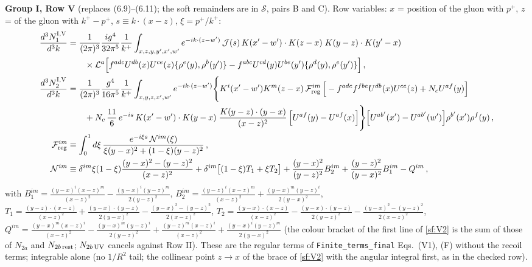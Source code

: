 \noindent\textbf{Group I, Row V} (replaces (6.9)--(6.11); the soft remainders are in $\mathcal{S}$, pairs B and C). Row variables: $x$ = position of the gluon with $p^{+}$, $z$ = of the gluon with $k^{+}-p^{+}$, $s\equiv k\cdot(x-z)$, $\xi=p^{+}/k^{+}$:
\begin{align}
\frac{d^{3}N^{\rm I,V}_{1}}{d^{3}k}&=\frac{1}{(2\pi)^{3}}\frac{ig^{4}}{32\pi^{5}}\frac{1}{k^{+}}\int_{x,z,y,y',x',w'}e^{-ik\cdot(z-w')}\,\mathcal{J}(s)\,K(x'-w')\cdot K(z-x)\;K(y-z)\cdot K(y'-x)\notag\\
&\qquad\times\mathcal{L}^{a}\Big[f^{adc}U^{db}(x)U^{ce}(z)\{\rho^{e}(y),\rho^{b}(y')\}-f^{abc}U^{cd}(y)U^{be}(y')\{\rho^{d}(y),\rho^{e}(y')\}\Big]\,,\label{sf:V1}\\
\frac{d^{3}N^{\rm I,V}_{2}}{d^{3}k}&=\frac{1}{(2\pi)^{3}}\frac{g^{4}}{16\pi^{5}}\frac{1}{k^{+}}\int_{x,y,z,x',w'}e^{-ik\cdot(z-w')}\Bigg\{K^{i}(x'-w')K^{m}(z-x)\,\mathcal{F}^{im}_{\rm reg}\,\Big[-f^{adc}f^{fbe}U^{db}(x)U^{ce}(z)+N_{c}U^{af}(y)\Big]\notag\\
&\qquad+N_{c}\,\frac{11}{6}\,e^{-is}\,K(x'-w')\cdot K(y-x)\;\frac{K(y-z)\cdot(y-x)}{(x-z)^{2}}\,\Big[U^{af}(y)-U^{af}(x)\Big]\Bigg\}\Big[U^{ab'}(x')-U^{ab'}(w')\Big]\rho^{b'}(x')\rho^{f}(y)\,,\label{sf:V2}\\
\mathcal{F}^{im}_{\rm reg}&\equiv\int_{0}^{1}d\xi\,\frac{e^{-i\xi s}\,\mathcal{N}^{im}(\xi)}{\xi(y-x)^{2}+(1-\xi)(y-z)^{2}}\,,\notag\\
\mathcal{N}^{im}&\equiv\delta^{im}\xi(1-\xi)\frac{(y-x)^{2}-(y-z)^{2}}{(x-z)^{2}}+\delta^{im}\big[(1-\xi)T_{1}+\xi T_{2}\big]+\frac{(y-x)^{2}}{(y-z)^{2}}B_{2}^{im}+\frac{(y-z)^{2}}{(y-x)^{2}}B_{1}^{im}-Q^{im}\,,\notag
\end{align}
with $B_{1}^{im}=\frac{(y-x)^{i}(x-z)^{m}}{(x-z)^{2}}-\frac{(y-x)^{i}(y-z)^{m}}{2(y-z)^{2}}$, $B_{2}^{im}=\frac{(y-z)^{i}(x-z)^{m}}{(x-z)^{2}}+\frac{(y-x)^{m}(y-z)^{i}}{2(y-x)^{2}}$, $T_{1}=\frac{(y-z)\cdot(x-z)}{(x-z)^{2}}+\frac{(y-x)\cdot(y-z)}{2(y-x)^{2}}-\frac{(y-x)^{2}-(y-z)^{2}}{2(x-z)^{2}}$, $T_{2}=\frac{(y-x)\cdot(x-z)}{(x-z)^{2}}-\frac{(y-x)\cdot(y-z)}{2(y-z)^{2}}-\frac{(y-x)^{2}-(y-z)^{2}}{2(x-z)^{2}}$, $Q^{im}=\frac{(y-x)^{m}(x-z)^{i}}{(x-z)^{2}}-\frac{(y-x)^{m}(y-z)^{i}}{2(y-z)^{2}}+\frac{(y-z)^{m}(x-z)^{i}}{(x-z)^{2}}+\frac{(y-x)^{i}(y-z)^{m}}{2(y-x)^{2}}$ (the colour bracket of the first line of \eqref{sf:V2} is the sum of those of $N_{2a}$ and $N_{2b\,\rm rest}$; $N_{2b\,\rm UV}$ cancels against Row II). These are the regular terms of \texttt{Finite\_terms\_final} Eqs.~(V1), (F) without the recoil terms; integrable alone (no $1/R^{2}$ tail; the collinear point $z\to x$ of the brace of \eqref{sf:V2} with the angular integral first, as in the checked row).

